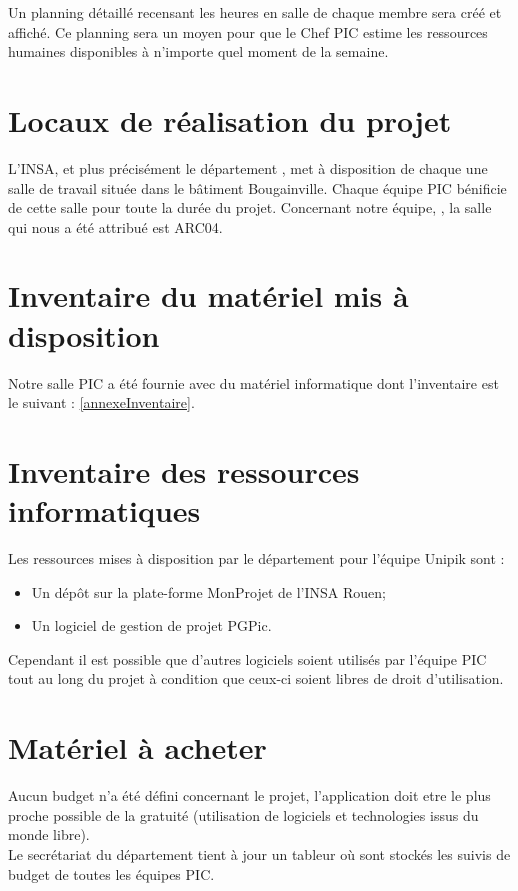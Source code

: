 Un planning détaillé recensant les heures en salle de chaque membre sera créé et affiché.
Ce planning sera un moyen pour que le Chef PIC estime les ressources humaines disponibles à n'importe quel moment de la semaine.

\section{Locaux de réalisation du projet}
\label{Locaux de réalisation du projet}
\indent L'INSA, et plus précisément le département \ASI{}, met à disposition de chaque une salle de travail située dans le bâtiment Bougainville. Chaque équipe PIC bénificie de cette salle pour toute la durée du projet.
Concernant notre équipe, \nomEquipe, la salle qui nous a été attribué est ARC04.

\section{Inventaire du matériel mis à disposition}
\label{Inventaire du matériel mis à disposition}
Notre salle PIC a été fournie avec du matériel informatique dont l'inventaire est le suivant : \ref{annexeInventaire}.

\section{Inventaire des ressources informatiques}
\label{Inventaire des ressources informatiques}
Les ressources mises à disposition par le département \ASI{} pour l'équipe Unipik sont :

\begin{itemize}
	\item Un dépôt \git{} sur la plate-forme MonProjet de l'INSA Rouen;
	\item Un logiciel de gestion de projet PGPic.\\
\end{itemize}

Cependant il est possible que d'autres logiciels soient utilisés par l'équipe PIC tout au long du projet à condition que ceux-ci soient libres de droit d'utilisation.

\section{Matériel à acheter}
\label{Matériel à acheter}
\indent Aucun budget n'a été défini concernant le projet, l'application doit etre le plus proche possible de la gratuité (utilisation de logiciels et technologies issus du monde libre). \\
\indent Le secrétariat du département tient à jour un tableur où sont stockés les suivis de budget de toutes les équipes PIC.

